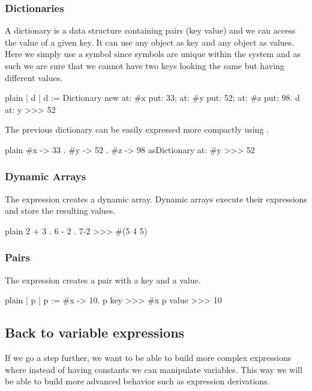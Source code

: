 \documentclass[10pt,twoside,english]{_support/latex/sbabook/sbabook}
\begin{document}
\subsubsection{Dictionaries}
A dictionary is a data structure containing pairs (key value) and we can access the value of a given key. It can use any object as key and any object as values. Here we simply use a symbol  since symbols are unique within the system and as such we are sure that we cannot have two keys looking the same but having different values. 

\begin{displaycode}{plain}
| d |
d := Dictionary new
	at: #x put: 33;
	at: #y put: 52;
	at: #z put: 98.
d at: y
>>> 52 
\end{displaycode}

The previous dictionary can be easily expressed more compactly using .

\begin{displaycode}{plain}
{#x -> 33 . #y -> 52 . #z -> 98} asDictionary at: #y
>>> 52 
\end{displaycode}
\subsubsection{Dynamic Arrays}
The expression \textcode{\{ \}} creates a dynamic array. Dynamic arrays execute their expressions and store the resulting values. 

\begin{displaycode}{plain}
{2 + 3 . 6 - 2 . 7-2 }
>>> #(5 4 5)
\end{displaycode}
\subsubsection{Pairs}
The expression  creates a pair with a key and a value.

\begin{displaycode}{plain}
| p |
p := #x -> 10.
p key 
>>> #x
p value
>>> 10
\end{displaycode}
\subsection{Back to variable expressions}
If we go a step further, we want to be able to build more complex expressions where instead of having constants we can manipulate variables. This way we will be able to build more advanced behavior such as expression derivations. 
\end{document}
